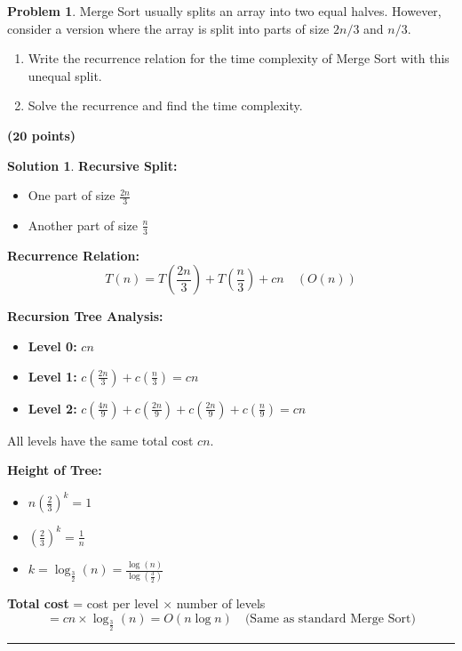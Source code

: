 \documentclass{article}
\theoremstyle{definition}
\newtheorem{problem}{Problem}
\def\fline{\rule{0.75\linewidth}{0.5pt}}
\newcommand{\finishline}{\begin{center}\fline\end{center}}
\newtheorem*{solution*}{Solution}
\newenvironment{solution}{\begin{solution*}}{{\finishline} \end{solution*}}
\newcommand{\grade}[1]{\hfill{\textbf{($\mathbf{#1}$ points)}}}
\begin{document}
\smallskip
\begin{problem}
	Merge Sort usually splits an array into two equal halves. However, consider a version where the array is split into parts of size $ 2n/3 $ and $n/3$.

\begin{enumerate}[label=\alph*)]
\item Write the recurrence relation for the time complexity of Merge Sort with this unequal split.
    \item Solve the recurrence and find the time complexity.
    
\end{enumerate}


\end{problem}
\grade{20}
\begin{solution}
	\textbf{Recursive Split:}
	\begin{itemize}
	\item One part of size \( \frac{2n}{3} \)
	\item Another part of size \( \frac{n}{3} \)
	\end{itemize}

	\textbf{Recurrence Relation:}
	\[
	T(n) = T\left(\frac{2n}{3}\right) + T\left(\frac{n}{3}\right) + cn \quad (O(n))
	\]

	\textbf{Recursion Tree Analysis:}
	\begin{itemize}
	\item \textbf{Level 0:} \( cn \)
	\item \textbf{Level 1:} \( c\left(\frac{2n}{3}\right) + c\left(\frac{n}{3}\right) = cn \)
	\item \textbf{Level 2:} \( c\left(\frac{4n}{9}\right) + c\left(\frac{2n}{9}\right) + c\left(\frac{2n}{9}\right) + c\left(\frac{n}{9}\right) = cn \)
	\end{itemize}
	All levels have the same total cost \( cn \).

	\textbf{Height of Tree:}
	\begin{itemize}
	\item \( n\left(\frac{2}{3}\right)^k = 1 \)
	\item \( \left(\frac{2}{3}\right)^k = \frac{1}{n} \)
	\item \( k = \log_{\frac{3}{2}}(n) = \frac{\log(n)}{\log\left(\frac{3}{2}\right)} \)
	\end{itemize}

	\textbf{Total cost} = cost per level \(\times\) number of levels 
	\[
	= cn \times \log_{\frac{3}{2}}(n) = O(n \log n) \quad \text{(Same as standard Merge Sort)}
	\]
\end{solution}
\end{document}
